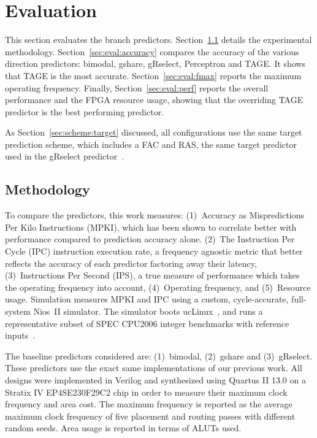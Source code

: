 \documentclass[conference]{IEEEtran}
\begin{document}
\section{Evaluation}
\label{sec:eval}
This section evaluates the branch predictors. Section~\ref{sec:eval:methodology} details the experimental methodology. Section~\ref{sec:eval:accuracy} compares the accuracy of the various direction predictors: bimodal, gshare, gRselect, Perceptron and TAGE. It shows that TAGE is the most accurate. Section~\ref{sec:eval:fmax} reports the maximum operating frequency. Finally, Section~\ref{sec:eval:perf} reports the overall performance and the FPGA resource usage, showing that the overriding TAGE predictor is the best performing predictor.

As Section~\ref{sec:scheme:target} discussed, all configurations use the same target prediction scheme, which includes a FAC and RAS, the same target predictor used in the gRselect predictor~\cite{grselect}.

\subsection{Methodology}
\label{sec:eval:methodology}
To compare the predictors, this work measures: (1)~Accuracy as Mispredictions Per Kilo Instructions (MPKI), which has been shown to correlate better with performance compared to prediction accuracy alone. (2)~The Instruction Per Cycle (IPC) instruction execution rate, a frequency agnostic metric that better reflects the accuracy of each predictor factoring away their latency, (3)~Instructions Per Second (IPS), a true measure of performance which takes the operating frequency into account, (4)~Operating frequency, and (5)~Resource usage. Simulation measures MPKI and IPC using a custom, cycle-accurate, full-system Nios~II simulator. The simulator boots ucLinux~\cite{uclinux}, and runs a representative subset of SPEC CPU2006 integer benchmarks with reference inputs~\cite{spec2k6}.

The baseline predictors considered are: (1)~bimodal, (2)~gshare and (3)~gRselect. These predictors use the exact same implementations of our previous work\cite{grselect}. All designs were implemented in Verilog and synthesized using Quartus II 13.0 on a Stratix IV EP4SE230F29C2 chip in order to measure their maximum clock frequency and area cost. The maximum frequency is reported as the average maximum clock frequency of five placement and routing passes with different random seeds. Area usage is reported in terms of ALUTs used.
\end{document}
